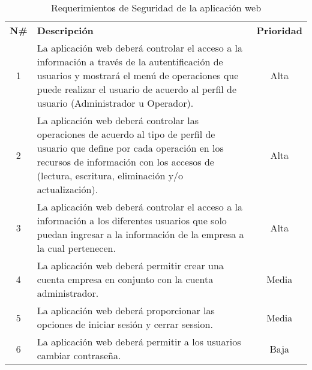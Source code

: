 \begin{table}[H]
	\centering
    \begin{tabular}{ |c|p{10cm}|c| }
	  \hline
	  \rowcolor{indigo-dark} \multicolumn{3}{|c|}{ \textcolor{white}{\textbf{Administración de Seguridad}}} \\
	  \hline
	  \rowcolor{indigo-light} \textbf{N\#} & \centering \textbf{Descripción} & \textbf{Prioridad} \\
	  \hline
	  1 & La aplicación web deberá controlar el acceso a la información a través de la autentificación de usuarios y mostrará el menú de operaciones que puede realizar el usuario de acuerdo al perfil de usuario (Administrador u Operador). & Alta\\
	  \hline
	  2 & La aplicación web deberá controlar las operaciones de acuerdo al tipo de perfil  de usuario que define por cada operación en los recursos de información con los accesos de (lectura, escritura, eliminación y/o actualización). & Alta\\
	  \hline
	  3 & La aplicación web deberá controlar el acceso a la información a los diferentes usuarios que solo puedan ingresar a la información de la empresa a la cual pertenecen. & Alta \\
	  \hline
	  4 & La aplicación web deberá permitir crear una cuenta empresa en conjunto con la cuenta administrador. & Media \\
	  \hline
	  5 & La aplicación web deberá proporcionar las opciones de iniciar sesión y cerrar session. &  Media\\
	  \hline
	  6 & La aplicación web deberá permitir a los usuarios cambiar contraseña. &  Baja \\
	  \hline
	\end{tabular}
	\caption{Requerimientos de Seguridad de la aplicación web}
\end{table}

